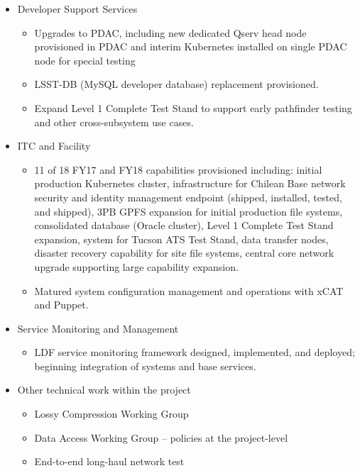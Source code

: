 {\begin{itemize}
\begin{itemize}
\end{itemize}
\item Developer Support Services

\begin{itemize}
    \item Upgrades to PDAC, including new dedicated Qserv head node provisioned in PDAC and interim Kubernetes installed on single PDAC node for special testing
    \item LSST-DB (MySQL developer database) replacement provisioned.
    \item Expand Level 1 Complete Test Stand to support early pathfinder testing and other cross-subsystem use cases.

\end{itemize}
\item ITC and Facility

\begin{itemize}
    \item 11 of 18 FY17 and FY18 capabilities provisioned including: initial production Kubernetes cluster, infrastructure for Chilean Base network security and identity management endpoint (shipped, installed, tested, and shipped), 3PB GPFS expansion for initial production file systems, consolidated database (Oracle cluster), Level 1 Complete Test Stand expansion, system for Tucson ATS Test Stand, data transfer nodes, disaster recovery capability for site file systems, central core network upgrade supporting large capability expansion.
    \item Matured system configuration management and operations with xCAT and Puppet.

\end{itemize}
\item Service Monitoring and Management

\begin{itemize}
    \item LDF service monitoring framework designed, implemented, and deployed; beginning integration of systems and base services.

\end{itemize}
\item Other technical work within the project

\begin{itemize}
    \item Lossy Compression Working Group
    \item Data Access Working Group -- policies at the project-level
    \item End-to-end long-haul network test
\end{itemize}
\end{itemize}
}


